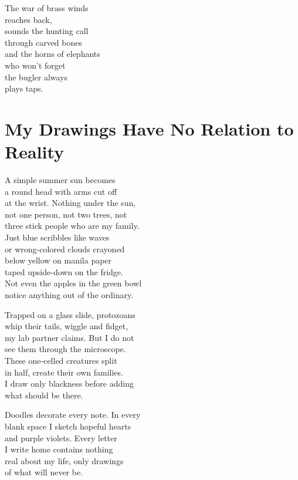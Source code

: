 \documentclass[twoside,10pt]{book}
\begin{document}
The war of brass winds\\
reaches back,\\
sounds the hunting call\\
through carved bones\\
and the horns of elephants\\
who won't forget\\
the bugler always\\
plays taps.


\clearpage
\section{My Drawings Have No Relation to Reality}

A simple summer sun becomes\\
a round head with arms cut off\\
at the wrist. Nothing under the sun,\\
not one person, not two trees, not\\
three stick people who are my family.\\
Just blue scribbles like waves\\
or wrong-colored clouds crayoned\\
below yellow on manila paper\\
taped upside-down on the fridge.\\
Not even the apples in the green bowl\\
notice anything out of the ordinary.

Trapped on a glass slide, protozoans\\
whip their tails, wiggle and fidget,\\
my lab partner claims. But I do not\\
see them through the microscope.\\
These one-celled creatures split\\
in half, create their own families.\\
I draw only blackness before adding\\
what should be there.

Doodles decorate every note. In every\\
blank space I sketch hopeful hearts\\
and purple violets. Every letter\\
I write home contains nothing\\
real about my life, only drawings\\
of what will never be.
\end{document}
